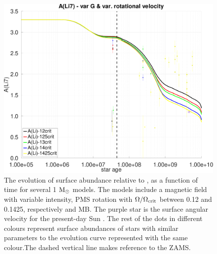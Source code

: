 \documentclass[fleqn,usenatbib]{mnras}
\begin{document}
\begin{ceqn}
\begin{figure}
	\includegraphics[clip,width=\columnwidth]{figures/paper2/li_var_vel_var_g_3.pdf}
    \caption{The evolution of surface  abundance relative to , as a function of time for several 1 $\mathrm{M}_\odot$ models. The models include a magnetic field with variable intensity, PMS rotation with $\Omega / \Omega_{\mathrm{crit}}$ between 0.12 and 0.1425, respectively and MB. The purple star is the surface angular velocity for the present-day Sun \citep{Gill2012}. The rest of the dots in different colours represent surface  abundances of stars with similar parameters to the evolution curve represented with the same colour.The dashed vertical line makes reference to the ZAMS.}
    \label{fig:li_var_vel_var_g_3}
\end{figure}



\end{ceqn}
\end{document}

